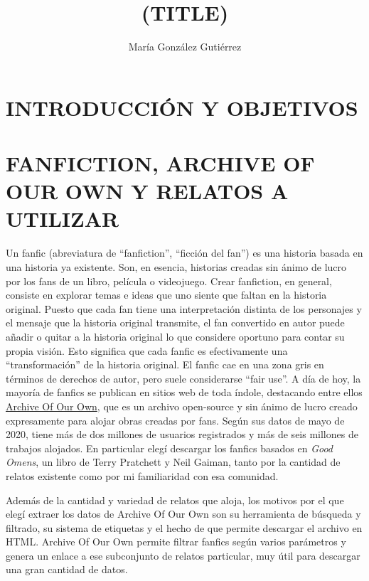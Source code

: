 \documentclass{pre-tfg}
\title{(TITLE)}
\author{María González Gutiérrez}
\begin{document}
\maketitle
\tableofcontents

\newpage


\section{INTRODUCCIÓN Y OBJETIVOS}


\section{FANFICTION, ARCHIVE OF OUR OWN Y RELATOS A UTILIZAR}
Un fanfic (abreviatura de “fanfiction”, “ficción del fan”) es una historia basada en una historia ya existente. Son, en esencia, historias creadas sin ánimo de lucro por los fans de un libro, película o videojuego. 
Crear fanfiction, en general, consiste en explorar temas e ideas que uno siente que faltan en la historia original. Puesto que cada fan tiene una interpretación distinta de los personajes y el mensaje que la historia original transmite, el fan convertido en autor puede añadir o quitar a la historia original lo que considere oportuno para contar su propia visión. Esto significa que cada fanfic es efectivamente una “transformación” de la historia original.
El fanfic cae en una zona gris en términos de derechos de autor, pero suele considerarse “fair use”. A día de hoy, la mayoría de fanfics se publican en sitios web de toda índole, destacando entre ellos \href{archiveofourown.org}{Archive Of Our Own}, que es un archivo open-source y sin ánimo de lucro creado expresamente para alojar obras creadas por fans. Según sus datos de mayo de 2020, tiene más de dos millones de usuarios registrados y más de seis millones de trabajos alojados. En particular elegí descargar los fanfics basados en \textit{Good Omens}, un libro de Terry Pratchett y Neil Gaiman, tanto por la cantidad de relatos existente como por mi familiaridad con esa comunidad.

Además de la cantidad y variedad de relatos que aloja, los motivos por el que elegí extraer los datos de Archive Of Our Own son su herramienta de búsqueda y filtrado, su sistema de etiquetas y el hecho de que permite descargar el archivo en HTML. Archive Of Our Own permite filtrar fanfics según varios parámetros y genera un enlace a ese subconjunto de relatos particular, muy útil para descargar una gran cantidad de datos.
\end{document}
